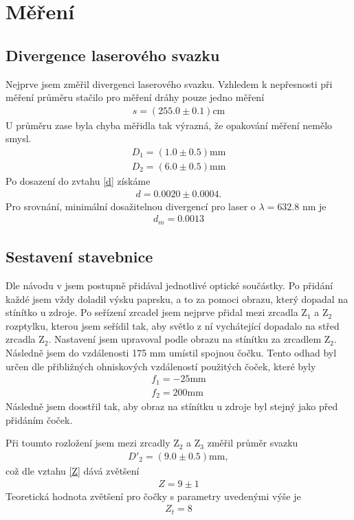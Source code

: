 \documentclass[a4paper,12pt]{article}
\begin{document}
\section{Měření}

\subsection{Divergence laserového svazku}
Nejprve jsem změřil divergenci laserového svazku. Vzhledem k nepřesnosti při měření průměru stačilo pro měření dráhy pouze jedno měření
\begin{eqnarray}
s=(255.0\pm0.1)\mbox{cm}
\end{eqnarray}
U průměru zase byla chyba měřidla tak výrazná, že opakování měření nemělo smysl.
\begin{eqnarray}
D_1=(1.0\pm0.5)\mbox{mm} \\
D_2=(6.0\pm0.5)\mbox{mm}
\end{eqnarray}
Po dosazení do zvtahu \ref{d} získáme
\begin{eqnarray}
d=0.0020 \pm 0.0004.
\end{eqnarray}
Pro srovnání, minimální dosažitelnou divergencí pro laser o $\lambda=632.8$ nm je
\begin{eqnarray}
d_m=0.0013
\end{eqnarray}

\subsection{Sestavení stavebnice}
Dle návodu v \cite{text} jsem postupně přidával jednotlivé optické součástky. Po přidání každé jsem vždy 
doladil výsku paprsku, a to za pomoci obrazu, který dopadal na stínítko u zdroje. Po seřízení zrcadel jsem 
nejprve přidal mezi zrcadla Z$_1$ a Z$_2$ rozptylku, kterou jsem seřídil tak, aby světlo z ní vychátející dopadalo 
na střed zrcadla Z$_2$. Nastavení jsem upravoval podle obrazu na stínítku za zrcadlem Z$_2$. Následně jsem do vzdálenosti 
175 mm umístil spojnou čočku. Tento odhad byl určen dle přibližných ohniskových vzdáleností použitých čoček, které byly
\begin{eqnarray}
f_1=-25\mbox{mm} \\
f_2=200\mbox{mm}
\end{eqnarray}
Následně jsem doostřil tak, aby obraz na stínítku u zdroje byl stejný jako před přidáním čoček.

Při toumto rozložení jsem mezi zrcadly Z$_2$ a Z$_3$ změřil průměr svazku
\begin{eqnarray}
D'_2=(9.0 \pm 0.5) \mbox{mm},
\end{eqnarray}
což dle vztahu \ref{Z} dává zvětšení
\begin{eqnarray}
Z=9 \pm 1
\end{eqnarray}
Teoretická hodnota zvětšení pro čočky s parametry uvedenými výše je
\begin{eqnarray}
Z_t=8
\end{eqnarray}
\end{document}
